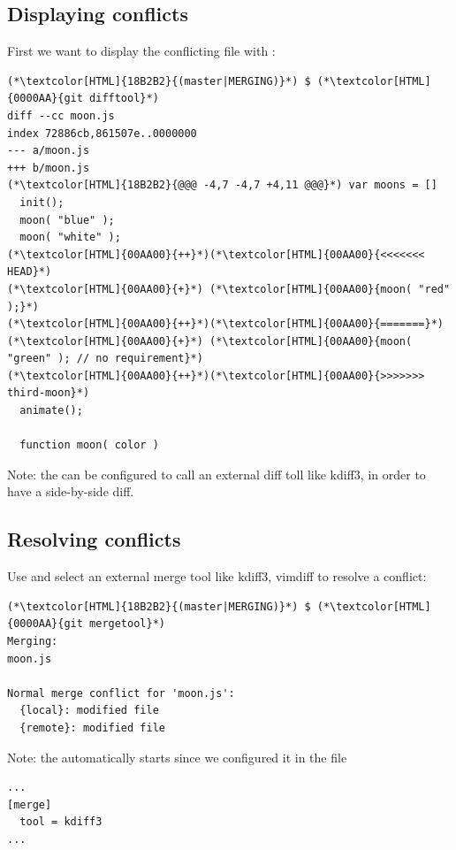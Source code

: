 \subsection{Displaying conflicts}
\begin{frame}[fragile]
  \subslidetitle

  First we want to display the conflicting file with :
  \begin{lstlisting}
(*\textcolor[HTML]{18B2B2}{(master|MERGING)}*) $ (*\textcolor[HTML]{0000AA}{git difftool}*)
diff --cc moon.js
index 72886cb,861507e..0000000
--- a/moon.js
+++ b/moon.js
(*\textcolor[HTML]{18B2B2}{@@@ -4,7 -4,7 +4,11 @@@}*) var moons = []
  init();
  moon( "blue" );
  moon( "white" );
(*\textcolor[HTML]{00AA00}{++}*)(*\textcolor[HTML]{00AA00}{<<<<<<< HEAD}*)
(*\textcolor[HTML]{00AA00}{+}*) (*\textcolor[HTML]{00AA00}{moon( "red" );}*)
(*\textcolor[HTML]{00AA00}{++}*)(*\textcolor[HTML]{00AA00}{=======}*)
(*\textcolor[HTML]{00AA00}{+}*) (*\textcolor[HTML]{00AA00}{moon( "green" ); // no requirement}*)
(*\textcolor[HTML]{00AA00}{++}*)(*\textcolor[HTML]{00AA00}{>>>>>>> third-moon}*)
  animate();

  function moon( color )
\end{lstlisting}
  Note: the  can be configured to call an external diff toll like kdiff3, in order to have a side-by-side diff.
\end{frame}

\subsection{Resolving conflicts}
\begin{frame}[fragile]
  \subslidetitle
  Use  and select an external merge tool like kdiff3, vimdiff to resolve a conflict:

  \begin{lstlisting}
(*\textcolor[HTML]{18B2B2}{(master|MERGING)}*) $ (*\textcolor[HTML]{0000AA}{git mergetool}*)
Merging:
moon.js

Normal merge conflict for 'moon.js':
  {local}: modified file
  {remote}: modified file
\end{lstlisting}

  Note: the  automatically starts since we configured it in the  file
  \begin{lstlisting}
...
[merge]
  tool = kdiff3
...
\end{lstlisting}
\end{frame}


